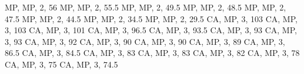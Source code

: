 \documentclass[
]{book}
\newenvironment{Shaded}{\begin{snugshade}}{\end{snugshade}}
\newcommand{\StringTok}[1]{\textcolor[rgb]{0.31,0.60,0.02}{#1}}
\begin{document}
\begin{Shaded}
\begin{Highlighting}[]
\StringTok{ \textquotesingle{}MP\textquotesingle{}, \textquotesingle{}MP\textquotesingle{}, 2, 56}
\StringTok{ \textquotesingle{}MP\textquotesingle{}, \textquotesingle{}MP\textquotesingle{}, 2, 55.5}
\StringTok{ \textquotesingle{}MP\textquotesingle{}, \textquotesingle{}MP\textquotesingle{}, 2, 49.5}
\StringTok{ \textquotesingle{}MP\textquotesingle{}, \textquotesingle{}MP\textquotesingle{}, 2, 48.5}
\StringTok{ \textquotesingle{}MP\textquotesingle{}, \textquotesingle{}MP\textquotesingle{}, 2, 47.5}
\StringTok{ \textquotesingle{}MP\textquotesingle{}, \textquotesingle{}MP\textquotesingle{}, 2, 44.5}
\StringTok{ \textquotesingle{}MP\textquotesingle{}, \textquotesingle{}MP\textquotesingle{}, 2, 34.5}
\StringTok{ \textquotesingle{}MP\textquotesingle{}, \textquotesingle{}MP\textquotesingle{}, 2, 29.5}
\StringTok{ \textquotesingle{}CA\textquotesingle{}, \textquotesingle{}MP\textquotesingle{}, 3, 103}
\StringTok{ \textquotesingle{}CA\textquotesingle{}, \textquotesingle{}MP\textquotesingle{}, 3, 103}
\StringTok{ \textquotesingle{}CA\textquotesingle{}, \textquotesingle{}MP\textquotesingle{}, 3, 101}
\StringTok{ \textquotesingle{}CA\textquotesingle{}, \textquotesingle{}MP\textquotesingle{}, 3, 96.5}
\StringTok{ \textquotesingle{}CA\textquotesingle{}, \textquotesingle{}MP\textquotesingle{}, 3, 93.5}
\StringTok{ \textquotesingle{}CA\textquotesingle{}, \textquotesingle{}MP\textquotesingle{}, 3, 93}
\StringTok{ \textquotesingle{}CA\textquotesingle{}, \textquotesingle{}MP\textquotesingle{}, 3, 93}
\StringTok{ \textquotesingle{}CA\textquotesingle{}, \textquotesingle{}MP\textquotesingle{}, 3, 92}
\StringTok{ \textquotesingle{}CA\textquotesingle{}, \textquotesingle{}MP\textquotesingle{}, 3, 90}
\StringTok{ \textquotesingle{}CA\textquotesingle{}, \textquotesingle{}MP\textquotesingle{}, 3, 90}
\StringTok{ \textquotesingle{}CA\textquotesingle{}, \textquotesingle{}MP\textquotesingle{}, 3, 89}
\StringTok{ \textquotesingle{}CA\textquotesingle{}, \textquotesingle{}MP\textquotesingle{}, 3, 86.5}
\StringTok{ \textquotesingle{}CA\textquotesingle{}, \textquotesingle{}MP\textquotesingle{}, 3, 84.5}
\StringTok{ \textquotesingle{}CA\textquotesingle{}, \textquotesingle{}MP\textquotesingle{}, 3, 83}
\StringTok{ \textquotesingle{}CA\textquotesingle{}, \textquotesingle{}MP\textquotesingle{}, 3, 83}
\StringTok{ \textquotesingle{}CA\textquotesingle{}, \textquotesingle{}MP\textquotesingle{}, 3, 82}
\StringTok{ \textquotesingle{}CA\textquotesingle{}, \textquotesingle{}MP\textquotesingle{}, 3, 78}
\StringTok{ \textquotesingle{}CA\textquotesingle{}, \textquotesingle{}MP\textquotesingle{}, 3, 75}
\StringTok{ \textquotesingle{}CA\textquotesingle{}, \textquotesingle{}MP\textquotesingle{}, 3, 74.5}

\end{Highlighting}
\end{Shaded}
\end{document}
